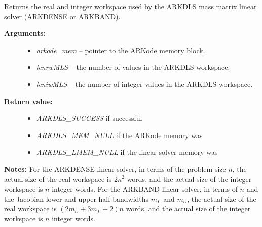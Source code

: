 \documentclass[letterpaper,10pt,english]{sphinxmanual}
\begin{document}
\begin{fulllineitems}
\label{c_interface/User_callable:c.ARKDlsGetMassWorkSpace}
Returns the real and integer workspace used by the
ARKDLS mass matrix linear solver (ARKDENSE or ARKBAND).
\begin{description}
\item[{\textbf{Arguments:}}] \leavevmode\begin{itemize}
\item {} 
\emph{arkode\_mem} -- pointer to the ARKode memory block.

\item {} 
\emph{lenrwMLS} -- the number of  values in the ARKDLS workspace.

\item {} 
\emph{leniwMLS} -- the number of integer values in the ARKDLS workspace.

\end{itemize}

\item[{\textbf{Return value:}}] \leavevmode\begin{itemize}
\item {} 
\emph{ARKDLS\_SUCCESS} if successful

\item {} 
\emph{ARKDLS\_MEM\_NULL} if the ARKode memory was 

\item {} 
\emph{ARKDLS\_LMEM\_NULL} if the linear solver memory was 

\end{itemize}

\end{description}

\textbf{Notes:} For the ARKDENSE linear solver, in terms of the problem
size \(n\), the actual size of the real workspace is
\(2n^2\)  words, and the actual size of the integer
workspace is \(n\) integer words. For the ARKBAND linear
solver, in terms of \(n\) and the Jacobian lower and upper
half-bandwidths \(m_L\) and \(m_U\), the actual size of the
real workspace is \((2m_U + 3m_L + 2)n\)  words,
and the actual size of the integer workspace is \(n\) integer
words.

\end{fulllineitems}

\end{document}
